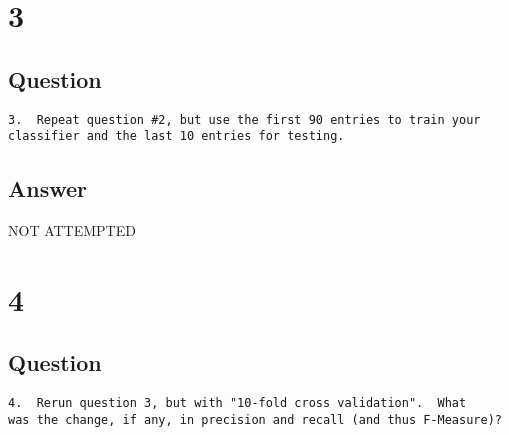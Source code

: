 \documentclass[letterpaper,11pt]{article}
\begin{document}

\clearpage


\section*{3}

\subsection*{Question}

\begin{verbatim}
3.  Repeat question #2, but use the first 90 entries to train your
classifier and the last 10 entries for testing.
\end{verbatim}

\subsection*{Answer}

\begin{center}
\Huge{NOT ATTEMPTED}
\end{center}




\section*{4}

\subsection*{Question}

\begin{verbatim}
4.  Rerun question 3, but with "10-fold cross validation".  What
was the change, if any, in precision and recall (and thus F-Measure)?
\end{verbatim}
\end{document}
